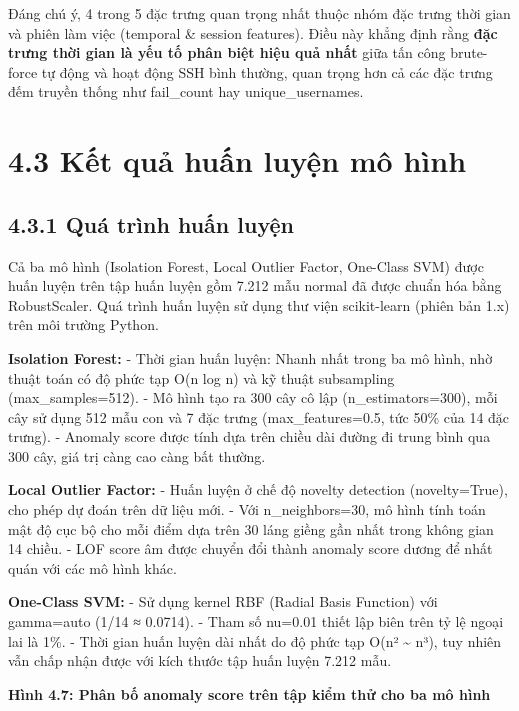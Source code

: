 \documentclass[
  a4paper]{report}
\begin{document}
Đáng chú ý, 4 trong 5 đặc trưng quan trọng nhất thuộc nhóm đặc trưng
thời gian và phiên làm việc (temporal \& session features). Điều này
khẳng định rằng \textbf{đặc trưng thời gian là yếu tố phân biệt hiệu quả
nhất} giữa tấn công brute-force tự động và hoạt động SSH bình thường,
quan trọng hơn cả các đặc trưng đếm truyền thống như fail\_count hay
unique\_usernames.

\section{4.3 Kết quả huấn luyện mô
hình}\label{kux1ebft-quux1ea3-huux1ea5n-luyux1ec7n-muxf4-huxecnh}

\subsection{4.3.1 Quá trình huấn
luyện}\label{quuxe1-truxecnh-huux1ea5n-luyux1ec7n}

Cả ba mô hình (Isolation Forest, Local Outlier Factor, One-Class SVM)
được huấn luyện trên tập huấn luyện gồm 7.212 mẫu normal đã được chuẩn
hóa bằng RobustScaler. Quá trình huấn luyện sử dụng thư viện
scikit-learn (phiên bản 1.x) trên môi trường Python.

\textbf{Isolation Forest:} - Thời gian huấn luyện: Nhanh nhất trong ba
mô hình, nhờ thuật toán có độ phức tạp O(n log n) và kỹ thuật
subsampling (max\_samples=512). - Mô hình tạo ra 300 cây cô lập
(n\_estimators=300), mỗi cây sử dụng 512 mẫu con và 7 đặc trưng
(max\_features=0.5, tức 50\% của 14 đặc trưng). - Anomaly score được
tính dựa trên chiều dài đường đi trung bình qua 300 cây, giá trị càng
cao càng bất thường.

\textbf{Local Outlier Factor:} - Huấn luyện ở chế độ novelty detection
(novelty=True), cho phép dự đoán trên dữ liệu mới. - Với
n\_neighbors=30, mô hình tính toán mật độ cục bộ cho mỗi điểm dựa trên
30 láng giềng gần nhất trong không gian 14 chiều. - LOF score âm được
chuyển đổi thành anomaly score dương để nhất quán với các mô hình khác.

\textbf{One-Class SVM:} - Sử dụng kernel RBF (Radial Basis Function) với
gamma=auto (1/14 ≈ 0.0714). - Tham số nu=0.01 thiết lập biên trên tỷ lệ
ngoại lai là 1\%. - Thời gian huấn luyện dài nhất do độ phức tạp O(n²
\textasciitilde{} n³), tuy nhiên vẫn chấp nhận được với kích thước tập
huấn luyện 7.212 mẫu.

\textbf{Hình 4.7: Phân bố anomaly score trên tập kiểm thử cho ba mô
hình}
\end{document}
